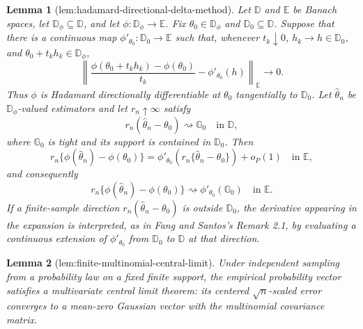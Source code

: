 \documentclass{article}
\newtheorem{lemma}{Lemma}
\begin{document}
\begin{lemma}[lem:hadamard-directional-delta-method]\label{lem:hadamard-directional-delta-method}
Let \(\mathbb D\) and \(\mathbb E\) be Banach spaces, let \(\mathbb D_\phi\subseteq\mathbb D\), and let \(\phi:\mathbb D_\phi\to\mathbb E\).  Fix \(\theta_0\in\mathbb D_\phi\) and \(\mathbb D_0\subseteq\mathbb D\).  Suppose that there is a continuous map \(\phi'_{\theta_0}:\mathbb D_0\to\mathbb E\) such that, whenever \(t_k\downarrow0\), \(h_k\to h\in\mathbb D_0\), and \(\theta_0+t_kh_k\in\mathbb D_\phi\),
\[
\left\|\frac{\phi(\theta_0+t_kh_k)-\phi(\theta_0)}{t_k}-\phi'_{\theta_0}(h)\right\|_{\mathbb E}\longrightarrow0.
\]
Thus \(\phi\) is Hadamard directionally differentiable at \(\theta_0\) tangentially to \(\mathbb D_0\).  Let \(\widehat\theta_n\) be \(\mathbb D_\phi\)-valued estimators and let \(r_n\uparrow\infty\) satisfy
\[
r_n(\widehat\theta_n-\theta_0)\rightsquigarrow\mathbb G_0
\quad\text{in }\mathbb D,
\]
where \(\mathbb G_0\) is tight and its support is contained in \(\mathbb D_0\).  Then
\[
r_n\{\phi(\widehat\theta_n)-\phi(\theta_0)\}
=\phi'_{\theta_0}\!\left(r_n\{\widehat\theta_n-\theta_0\}\right)+o_P(1)
\quad\text{in }\mathbb E,
\]
and consequently
\[
r_n\{\phi(\widehat\theta_n)-\phi(\theta_0)\}
\rightsquigarrow\phi'_{\theta_0}(\mathbb G_0)
\quad\text{in }\mathbb E.
\]
If a finite-sample direction \(r_n(\widehat\theta_n-\theta_0)\) is outside \(\mathbb D_0\), the derivative appearing in the expansion is interpreted, as in Fang and Santos's Remark 2.1, by evaluating a continuous extension of \(\phi'_{\theta_0}\) from \(\mathbb D_0\) to \(\mathbb D\) at that direction.
\end{lemma}

\begin{lemma}[lem:finite-multinomial-central-limit]\label{lem:finite-multinomial-central-limit}
Under independent sampling from a probability law on a fixed finite support, the empirical probability vector satisfies a multivariate central limit theorem: its centered \(\sqrt n\)-scaled error converges to a mean-zero Gaussian vector with the multinomial covariance matrix.
\end{lemma}
\end{document}
